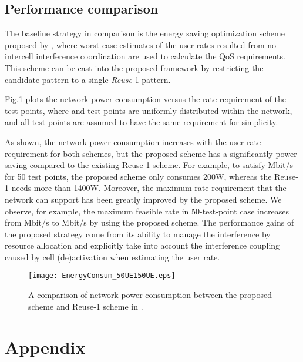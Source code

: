 \documentclass{article}
\begin{document}
\subsection{Performance comparison}
\label{sec:perf-prop-scheme}

The baseline strategy in comparison is the energy saving optimization
scheme proposed by \cite{Cavalcante2014a}, where worst-case estimates
of the user rates resulted from no intercell interference coordination
are used to calculate the QoS requirements. This scheme can be cast
into the proposed framework by restricting the candidate pattern to a
single \emph{Reuse}-1 pattern.

Fig.\ref{fig_compare} plots the network power consumption versus the
rate requirement of the test points, where  and  test points
are uniformly distributed within the network, and all test points are
assumed to have the same requirement for simplicity.

As shown, the network power consumption increases with the user rate
requirement for both schemes, but the proposed scheme has a
significantly power saving compared to the existing Reuse-1
scheme. For example, to satisfy Mbit/s for 50 test points, the
proposed scheme only consumes 200W, whereas the Reuse-1 needs more
than 1400W. Moreover, the maximum rate requirement that the network
can support has been greatly improved by the proposed scheme. We
observe, for example, the maximum feasible rate in 50-test-point case
increases from Mbit/s to Mbit/s by using the proposed
scheme. The performance gains of the proposed strategy come from its
ability to manage the interference by resource allocation and
explicitly take into account the interference coupling caused by cell
(de)activation when estimating the user rate.






\begin{figure}[!t]
\centering
\texttt{[image: EnergyConsum\_50UE150UE.eps]}
\caption{A comparison of network power consumption between the proposed
  scheme and Reuse-1 scheme in \cite{Cavalcante2014a}. }\label{fig_compare}
\end{figure}




\section{Appendix}
\end{document}
